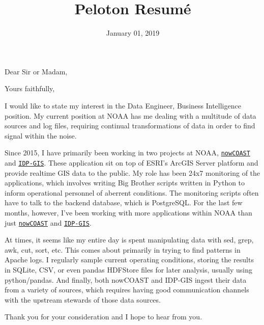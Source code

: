 \documentclass[11pt,a4paper,sans]{moderncv}        %
\title{Peloton Resumé}
\begin{document}
\date{January 01, 2019}
\opening{Dear Sir or Madam,}
\closing{Yours faithfully,}
\makelettertitle

I would like to state my interest in the Data Engineer, Business Intelligence
position.  My current position at NOAA has me dealing with a multitude of
data sources and log files, requiring continual transformations of data in 
order to find signal within the noise.  

Since 2015, I have primarily been working in two projects at NOAA, 
\href{https://nowcoast.noaa.gov}{\texttt{nowCOAST}}
and
\href{https://idpgis.ncep.noaa.gov}{\texttt{IDP-GIS}}.
These application sit on top of ESRI's ArcGIS Server platform and provide
realtime GIS data to the public.  My role has been 24x7 monitoring of the
applications, which involves writing Big Brother scripts written in Python
to inform operational
personnel of aberrent conditions.  The monitoring scripts often have to talk
to the backend database, which is PostgreSQL.
For the last few months, however, I've been working with more applications
within NOAA than just 
\href{https://nowcoast.noaa.gov}{\texttt{nowCOAST}}
and
\href{https://idpgis.ncep.noaa.gov}{\texttt{IDP-GIS}}.

At times, it seems like my entire day is spent manipulating data
with sed, grep, awk, cut, sort, etc.  This comes about primarily in trying
to find patterns in Apache logs.  I regularly sample current
operating conditions, storing the results in SQLite, CSV, or even 
pandas HDFStore files
for later analysis, usually using python/pandas.  And finally, both
nowCOAST and IDP-GIS ingest their data from a variety of sources,
which requires having good communication channels with the upstream
stewards of those data sources.

Thank you for your consideration and I hope to hear from you.


\makeletterclosing

\end{document}
